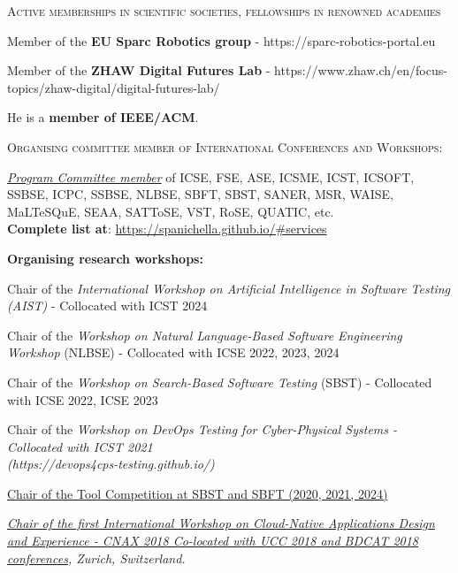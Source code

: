 \documentclass[11pt]{article}
\begin{document}
\textsc{Active memberships in scientific societies, fellowships in renowned academies}

\begin{innerlist}
\item Member of the \textbf{EU Sparc Robotics group} - https://sparc-robotics-portal.eu
\item Member of the \textbf{ZHAW Digital Futures Lab} - https://www.zhaw.ch/en/focus-topics/zhaw-digital/digital-futures-lab/
\item  He is a \textbf{member of IEEE/ACM}.
\end{innerlist}

\medskip\medskip 
\textsc{Organising committee member of International Conferences and Workshops:}
\medskip 
\begin{innerlist}
 \item \href{https://spanichella.github.io/#services}{\textit{Program Committee member}} of ICSE, FSE, ASE, ICSME, ICST, ICSOFT, SSBSE, ICPC, SSBSE, NLBSE, SBFT, SBST, SANER, MSR, WAISE, MaLTeSQuE, SEAA, SATToSE, VST, RoSE, QUATIC, etc.  \\\textbf{Complete list at}: \href{https://spanichella.github.io/\#services}{https://spanichella.github.io/\#services}
 \end{innerlist}
\medskip 
\textbf{Organising research workshops:}
\begin{innerlist}
\item Chair of the \textit{International Workshop on Artificial Intelligence in Software Testing (AIST)} - Collocated with ICST 2024
\item Chair of the \textit{Workshop on Natural Language-Based Software Engineering Workshop} (NLBSE) - Collocated with ICSE 2022, 2023, 2024
\item Chair of  the \textit{Workshop on Search-Based Software Testing} (SBST) - Collocated with ICSE 2022, ICSE 2023
\item Chair of the \textit{Workshop on DevOps Testing for Cyber-Physical Systems - Collocated with ICST 2021 \\(https://devops4cps-testing.github.io/)} 
\item \href{}
{Chair of the Tool Competition at SBST and SBFT (2020, 2021, 2024)} 
       \item \emph{\href{http://cnax.servicelaboratory.ch/}
                   {\textit{Chair of the first International Workshop on Cloud-Native Applications Design and Experience - CNAX 2018
Co-located with UCC 2018 and BDCAT 2018 conferences}}, Zurich, Switzerland.}
\end{innerlist}
\end{document}
